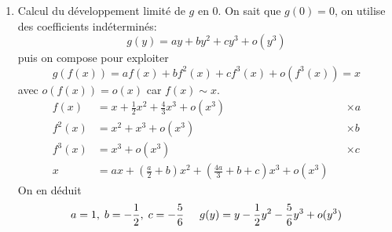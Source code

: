\begin{enumerate}
\begin{enumerate}
  \item Calcul du développement limité de $g$ en $0$. On sait que $g(0)=0$, on utilise des coefficients indéterminés:
\begin{displaymath}
  g(y) = ay + by^2 + cy^3 + o(y^3)
\end{displaymath}
puis on compose pour exploiter 
\begin{displaymath}
g(f(x)) = af(x) + bf^2(x) + cf^3(x) + o(f^3(x)) = x  
\end{displaymath}
avec $o(f(x)) = o(x)$ car $f(x)\sim x$.
\begin{align*}
  f(x) &= x + \frac{1}{2}x^2 + \frac{4}{3}x^3 + o(x^3) & &\times a \\
  f^2(x) &= x^2 + x^3 + o(x^3) & &\times b \\
  f^3(x) &= x^3 + o(x^3) & &\times c \\ \hline
  x &= ax + \left( \frac{a}{2}+b\right)x^2 + \left( \frac{4a}{3}+b+c\right)x^3 + o(x^3)  
\end{align*}
On en déduit
\begin{displaymath}
a=1,\; b = -\frac{1}{2},\; c = -\frac{5}{6} \hspace{0.5cm} g(y) = y -\frac{1}{2}y^2 - \frac{5}{6}y^3 + o(y^3)
\end{displaymath}
\end{enumerate}


\end{enumerate}
